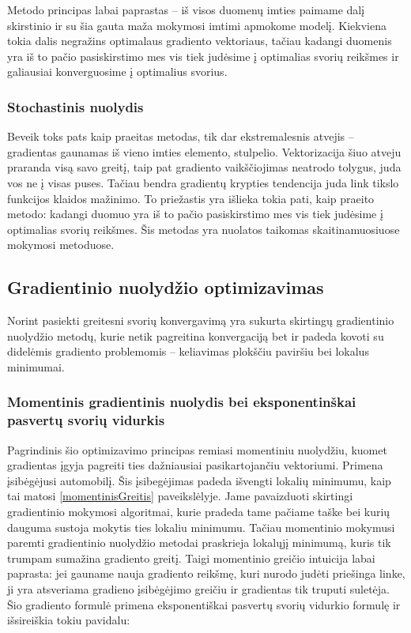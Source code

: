 \documentclass[a4paper, 12pt]{article}
\begin{document}
Metodo principas labai paprastas – iš visos duomenų imties paimame dalį skirstinio ir su šia gauta maža mokymosi imtimi apmokome modelį. Kiekviena tokia dalis negražins optimalaus gradiento vektoriaus, tačiau kadangi duomenis yra iš to pačio pasiskirstimo mes vis tiek judėsime į optimalias svorių reikšmes ir galiausiai konverguosime į optimalius svorius.

%
\subsubsection{Stochastinis nuolydis}
%

Beveik toks pats kaip praeitas metodas, tik dar ekstremalesnis atvejis – gradientas gaunamas iš vieno imties elemento, stulpelio. Vektorizacija šiuo atveju praranda visą savo greitį, taip pat gradiento vaikščiojimas neatrodo tolygus, juda vos ne į visas puses. Tačiau bendra gradientų krypties tendencija juda link tikslo funkcijos klaidos mažinimo. To priežastis yra išlieka tokia pati, kaip praeito metodo: kadangi duomuo yra iš to pačio pasiskirstimo mes vis tiek judėsime į optimalias svorių reikšmes. Šis metodas yra nuolatos taikomas skaitinamuosiuose mokymosi metoduose.

%
\subsection{Gradientinio nuolydžio optimizavimas}
%

Norint pasiekti greitesni svorių konvergavimą yra sukurta skirtingų gradientinio nuolydžio metodų, kurie netik pagreitina konvergaciją bet ir padeda kovoti su didelėmis gradiento problemomis – keliavimas plokščiu paviršiu bei lokalus minimumai.

%
\subsubsection{Momentinis gradientinis nuolydis bei eksponentinškai pasvertų svorių vidurkis}
%

Pagrindinis šio optimizavimo principas remiasi momentiniu nuolydžiu, kuomet gradientas įgyja pagreiti ties dažniausiai pasikartojančiu vektoriumi. Primena įsibėgėjusi automobilį. Šis įsibegėjimas padeda išvengti lokalių minimumu, kaip tai matosi \ref{momentinisGreitis} paveikslėlyje. Jame pavaizduoti skirtingi gradientinio mokymosi algoritmai, kurie pradeda tame pačiame taške bei kurių dauguma sustoja mokytis ties lokaliu minimumu. Tačiau momentinio mokymusi paremti gradientinio nuolydžio metodai praskrieja lokalųjį minimumą, kuris tik trumpam sumažina gradiento greitį. Taigi momentinio greičio intuicija labai paprasta: jei gauname nauja gradiento reikšmę, kuri nurodo judėti priešinga linke, ji yra atsveriama gradieno įsibėgėjimo greičiu ir gradientas tik truputi suletėja. Šio gradiento formulė primena eksponentiškai pasvertų svorių vidurkio formulę ir išsireiškia tokiu pavidalu:
\end{document}
